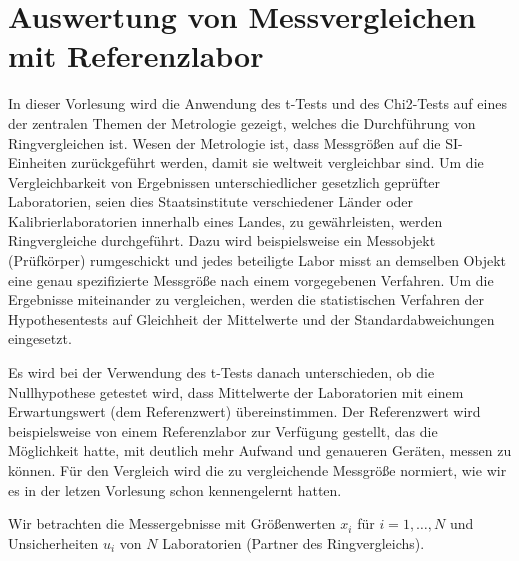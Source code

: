 
\section{Auswertung von Messvergleichen mit Referenzlabor}
In dieser Vorlesung wird die Anwendung des t-Tests und des Chi2-Tests auf eines der zentralen Themen der Metrologie gezeigt, welches die Durchführung von Ringvergleichen ist. Wesen der Metrologie ist, dass Messgrößen auf die SI-Einheiten zurückgeführt werden, damit sie weltweit vergleichbar sind. Um die Vergleichbarkeit von Ergebnissen unterschiedlicher gesetzlich geprüfter Laboratorien, seien dies Staatsinstitute verschiedener Länder oder Kalibrierlaboratorien innerhalb eines Landes, zu gewährleisten, werden Ringvergleiche durchgeführt.
Dazu wird beispielsweise ein Messobjekt (Prüfkörper) rumgeschickt und jedes beteiligte Labor misst an demselben Objekt eine genau spezifizierte Messgröße nach einem vorgegebenen Verfahren. Um die Ergebnisse miteinander zu vergleichen, werden die statistischen Verfahren der Hypothesentests auf Gleichheit der Mittelwerte und der Standardabweichungen eingesetzt.

Es wird bei der Verwendung des t-Tests danach unterschieden, ob die Nullhypothese getestet wird, dass Mittelwerte der Laboratorien mit einem Erwartungswert (dem Referenzwert) übereinstimmen.
Der Referenzwert wird beispielsweise von einem Referenzlabor zur Verfügung gestellt, das die Möglichkeit hatte, mit deutlich mehr Aufwand und genaueren Geräten, messen zu können.
Für den Vergleich wird die zu vergleichende Messgröße normiert, wie wir es in der letzen Vorlesung schon kennengelernt hatten.

Wir betrachten die Messergebnisse mit Größenwerten $x_i$ für $i = 1,\dots,N$ und Unsicherheiten $u_i$ von $N$ Laboratorien (Partner des Ringvergleichs).

